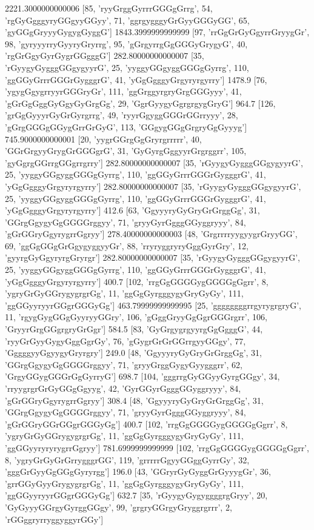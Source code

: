 2221.3000000000006 [85, 'ryyGrggGyrrrGGGgGrrg', 54, 'rgGyGgggyryGGgyyGGyy', 71, 'ggrgygggyGrGyyGGGyGG', 65, 'gyGGgGryyyGygygGyggG']
1843.3999999999999 [97, 'rrGgGrGyGgyrrGryygGr', 98, 'gyryyyrryGyyryGryrrg', 95, 'gGrgyrrgGgGGGyGrygyG', 40, 'rgGrGgyGyrGygrGGgggG']
282.80000000000007 [35, 'rGyygyGygggGGgygyyrG', 25, 'yyggyGGgyggGGGgGyrrg', 110, 'ggGGyGrrrGGGrGygggrG', 41, 'yGgGgggyGrgyryrgyrry']
1478.9 [76, 'ygygGgygrryyrGGGryGr', 111, 'ggGrggyrgryGrgGGGyyy', 41, 'gGrGgGggGyGgyGyGrgGg', 29, 'GgrGyygyGgrgrgygGryG']
964.7 [126, 'grGgGyyyrGyGrGyrgrrg', 49, 'ryyrGgyggGGGrGGrryyy', 28, 'gGrgGGGgGGygGrrGrGyG', 113, 'GGgygGGgGrgryGgGyyyg']
745.9000000000001 [20, 'yygrGGrgGgGryrgrrrrr', 40, 'GGrGrgyyGrygGrGGGgrG', 31, 'GyGyrgGggyyrGrgrggrr', 105, 'gyGgrgGGrrgGGgrrgrry']
282.80000000000007 [35, 'rGyygyGygggGGgygyyrG', 25, 'yyggyGGgyggGGGgGyrrg', 110, 'ggGGyGrrrGGGrGygggrG', 41, 'yGgGgggyGrgyryrgyrry']
282.80000000000007 [35, 'rGyygyGygggGGgygyyrG', 25, 'yyggyGGgyggGGGgGyrrg', 110, 'ggGGyGrrrGGGrGygggrG', 41, 'yGgGgggyGrgyryrgyrry']
412.6 [63, 'GgyyyryGyGryGrGrggGg', 31, 'GGrgGgygyGgGGGGrggyy', 71, 'gryyGyrGgggGGyggryyy', 84, 'gGrGGryGgyrygrrGgryy']
278.40000000000003 [48, 'GrgrrrryygyygrGryyGG', 69, 'ggGgGGgGrGgygyggyyGr', 88, 'rryryggryryGggGyrGry', 12, 'gyyrgGyGgyryrgGryrgr']
282.80000000000007 [35, 'rGyygyGygggGGgygyyrG', 25, 'yyggyGGgyggGGGgGyrrg', 110, 'ggGGyGrrrGGGrGygggrG', 41, 'yGgGgggyGrgyryrgyrry']
400.7 [102, 'rrgGgGGGGygGGGGgGgrr', 8, 'ygryGrGyGGrygygrgrGg', 11, 'ggGgGyrgggygyGryGyGy', 111, 'ggGGyyryyrGGgrGGGyGg']
463.79999999999995 [25, 'ggggggggrrgyrygrgryG', 11, 'rgygGygGGgGyyryyGGry', 106, 'gGggGryyGgGgrGGGrgrr', 106, 'GryyrGrgGGgrgryGrGgr']
584.5 [83, 'GyGrgygrgyyrgGgGgggG', 44, 'ryyGrGyyGygyGggGgrGy', 76, 'gGygrGrGrGGrrgyyGGgy', 77, 'GggggyyGgyygyGryrgry']
249.0 [48, 'GgyyyryGyGryGrGrggGg', 31, 'GGrgGgygyGgGGGGrggyy', 71, 'gryyGrggGygyGyygggrr', 62, 'GrgyGGygGGGrGgGyrryG']
698.7 [104, 'gggrrgGyGGyyGyrgGGgy', 34, 'rryygrgrGrGyGGgGgyyg', 42, 'GyrGGyrGgggGGyggryyy', 84, 'gGrGGryGgyrygrrGgryy']
308.4 [48, 'GgyyyryGyGryGrGrggGg', 31, 'GGrgGgygyGgGGGGrggyy', 71, 'gryyGyrGgggGGyggryyy', 84, 'gGrGGryGGrGGgrGGGyGg']
400.7 [102, 'rrgGgGGGGygGGGGgGgrr', 8, 'ygryGrGyGGrygygrgrGg', 11, 'ggGgGyrgggygyGryGyGy', 111, 'ggGGyyryryrygrrGgryy']
781.6999999999999 [102, 'rrgGgGGGGygGGGGgGgrr', 8, 'ygryGrGyGrGrrygggrGG', 119, 'grrrrrGgyyGGggGyrrGy', 32, 'gggGrGyyGgGGgGyryrgg']
196.0 [43, 'GGryrGyGyggGrGyyygGr', 36, 'grrGGyGyyGrygygrgrGg', 11, 'ggGgGyrgggygyGryGyGy', 111, 'ggGGyyryyrGGgrGGGyGg']
632.7 [35, 'rGyygyGygyggggrgGryy', 20, 'GyGyyyGGrgyGyrggGGgy', 99, 'grgryGGrgyGryggrgrrr', 2, 'rGGggryrryggyggyrGGy']
